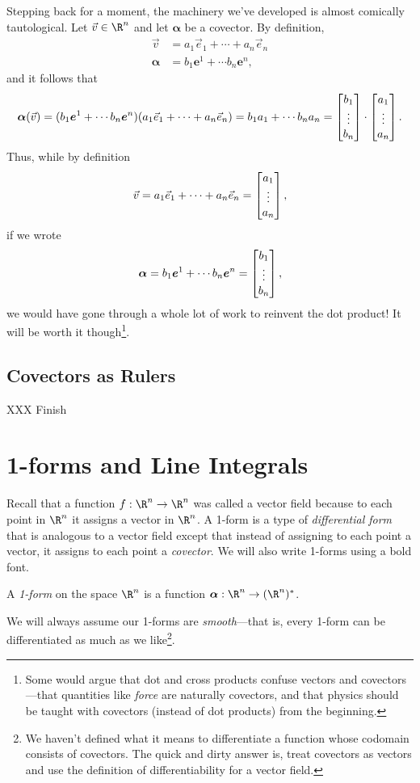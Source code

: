 Stepping back for a moment, the machinery we've developed is almost comically
tautological.  Let $\vec v\in \R^n$ and let $\bm \alpha$ be a covector.  By 
definition,
\begin{align*}
	\vec v &= a_1\vec e_1+\cdots +a_n\vec e_n\\
	\bm \alpha &= b_1\bm e^1+\cdots b_n\bm e^n,
\end{align*}
and it follows that
\[
	\bm \alpha(\vec v) = 
	(b_1\bm e^1+\cdots b_n\bm e^n)(a_1\vec e_1+\cdots +a_n\vec e_n)
	=b_1a_1+\cdots b_na_n = \begin{bmatrix}b_1\\\vdots\\b_n\end{bmatrix}\cdot \begin{bmatrix}a_1\\\vdots\\
	a_n\end{bmatrix}.
\]
Thus, while by definition 
\[
\vec v=a_1\vec e_1+\cdots +a_n\vec e_n=
\begin{bmatrix}a_1\\\vdots\\a_n\end{bmatrix},\]
if we  wrote
\[
	\bm \alpha =b_1\bm e^1+\cdots b_n\bm e^n=
\begin{bmatrix}b_1\\\vdots\\b_n\end{bmatrix},\]
we would have gone through
a whole lot of work to reinvent the dot product!  It will be worth it 
though\footnote{ Some would argue that dot and cross products confuse
vectors and covectors---that quantities like \emph{force}
are naturally covectors, and that physics should be taught
with covectors (instead of dot products) from the beginning.}.


\subsection{Covectors as Rulers}

XXX Finish


\section{1-forms and Line Integrals}

Recall that a function $f:\R^n\to\R^n$ was called a
vector field because to each point in $\R^n$ it assigns a
vector in $\R^n$.  A 1-form is a type of \emph{differential 
form} that is analogous to a vector field
except that instead of assigning to each point a vector,
it assigns to each point a \emph{covector}.  We will also write
1-forms using a bold font.

\begin{definition}[1-form]
	A \emph{1-form} on the space $\R^n$ is a function
	$\bm \alpha: \R^n\to (\R^n)^*$.
\end{definition}
We will always assume our 1-forms are \emph{smooth}---that is, every 1-form
can be differentiated as much as we like\footnote{ We haven't defined
what it means to differentiate a function whose codomain consists of covectors.
The quick and dirty answer is, treat covectors as vectors and use
the definition of differentiability for a vector field.}.

